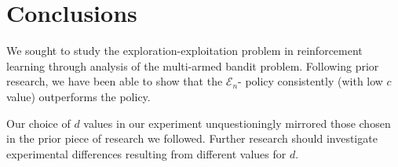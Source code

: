 
\section{Conclusions}
\label{sec:concl}

We sought to study the exploration-exploitation problem in reinforcement
learning through analysis of the multi-armed bandit problem. Following prior
research, we have been able to show that the $\mathcal{E}_n$-
policy consistently (with low $c$ value) outperforms the  policy.

Our choice of $d$ values in our experiment unquestioningly mirrored those
chosen in the prior piece of research we followed. Further research should investigate
experimental differences resulting from different values for $d$.